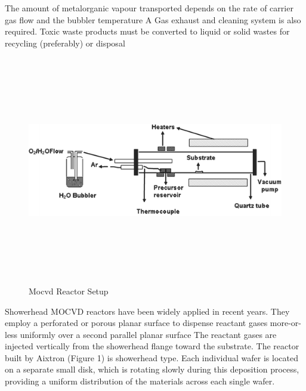 \begin{flushleft}
\vspace{3mm}
\newline
The amount of metalorganic vapour transported depends on the rate of carrier gas flow and the bubbler temperature
\vspace{3mm}
\newline
A Gas exhaust and cleaning system is also required. Toxic waste products must be converted to liquid or solid wastes for recycling (preferably) or disposal
\vspace{3mm}
\newline
\begin{figure}[h!] 
	\centering
	\includegraphics[width=15cm, height=10cm]{images/reactor1.png} 
	\caption{Mocvd Reactor Setup}
	\label{fig:img6} 
\end{figure}
\vspace{3mm}
\newline
Showerhead MOCVD reactors have been widely applied in recent years. They employ a perforated or porous planar surface to dispense reactant gases more-or-less uniformly over a second parallel planar surface The reactant gases are injected vertically from the showerhead flange toward the substrate.
\vspace{3mm}
\newline
The reactor built by Aixtron (Figure 1) is showerhead type.
\vspace{3mm}
\newline
Each individual wafer is located on a separate small disk, which is rotating slowly during this deposition process, providing a uniform distribution of the materials across each single wafer.

\end{flushleft}
